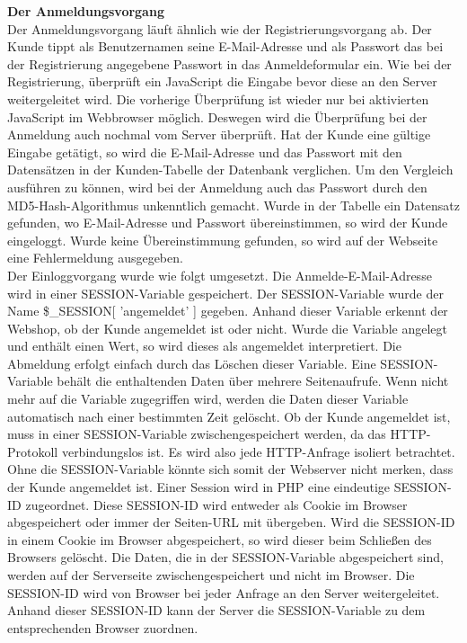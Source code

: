 \textbf{Der Anmeldungsvorgang}\\
Der Anmeldungsvorgang läuft ähnlich wie der Registrierungsvorgang ab. Der Kunde tippt als Benutzernamen seine E-Mail-Adresse und als Passwort das bei der Registrierung angegebene Passwort in das Anmeldeformular ein. Wie bei der Registrierung, überprüft ein JavaScript die Eingabe bevor diese an den Server weitergeleitet wird. Die vorherige Überprüfung ist wieder nur bei aktivierten JavaScript im Webbrowser möglich. Deswegen wird die Überprüfung bei der Anmeldung auch nochmal vom Server überprüft. Hat der Kunde eine gültige Eingabe getätigt, so wird die E-Mail-Adresse und das Passwort mit den Datensätzen in der Kunden-Tabelle der Datenbank verglichen. Um den Vergleich ausführen zu können, wird bei der Anmeldung auch das Passwort durch den  \glqq MD5-Hash-Algorithmus\grqq{} unkenntlich gemacht. Wurde in der Tabelle ein Datensatz gefunden, wo E-Mail-Adresse und Passwort übereinstimmen, so wird der Kunde eingeloggt. Wurde keine Übereinstimmung gefunden, so wird auf der Webseite eine Fehlermeldung ausgegeben.\\ 
Der Einloggvorgang wurde wie folgt umgesetzt. Die Anmelde-E-Mail-Adresse wird in einer SESSION-Variable gespeichert. Der SESSION-Variable wurde der Name \glqq \$\_SESSION[ 'angemeldet' ]\grqq{} gegeben. Anhand dieser Variable erkennt der Webshop, ob der Kunde angemeldet ist oder nicht. Wurde die Variable angelegt und enthält einen Wert, so wird dieses als angemeldet interpretiert. Die Abmeldung erfolgt einfach durch das Löschen dieser Variable. Eine SESSION-Variable behält die enthaltenden Daten über mehrere Seitenaufrufe. Wenn nicht mehr auf die Variable zugegriffen wird, werden die Daten dieser Variable automatisch nach einer bestimmten Zeit gelöscht. Ob der Kunde angemeldet ist, muss in einer SESSION-Variable zwischengespeichert werden, da das HTTP-Protokoll verbindungslos ist. Es wird also jede HTTP-Anfrage isoliert betrachtet. Ohne die SESSION-Variable könnte sich somit der Webserver nicht merken, dass der Kunde angemeldet ist. Einer Session wird in PHP eine eindeutige \glqq SESSION-ID\grqq{} zugeordnet. Diese SESSION-ID wird entweder als Cookie im Browser abgespeichert oder immer der Seiten-URL mit übergeben. Wird die SESSION-ID in einem Cookie im Browser abgespeichert, so wird dieser beim Schließen des Browsers gelöscht. Die Daten, die in der SESSION-Variable abgespeichert sind, werden auf der Serverseite zwischengespeichert und nicht im Browser. Die SESSION-ID wird von Browser bei jeder Anfrage an den Server weitergeleitet. Anhand dieser SESSION-ID kann der Server die SESSION-Variable zu dem entsprechenden Browser zuordnen.\\

